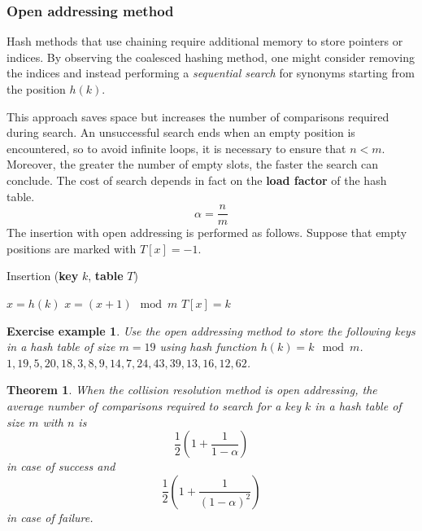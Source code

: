 \documentclass{report}
\newtheorem{teo}{Theorem}[chapter]
\newtheorem{es}{Exercise example}[chapter]
\begin{document}
\subsubsection{Open addressing method}
Hash methods that use chaining require additional memory to store pointers or indices. By observing the coalesced hashing method, one might consider removing the indices and instead performing a \textit{sequential search} for synonyms starting from the position $h(k)$.

This approach saves space but increases the number of comparisons required during search. An unsuccessful search ends when an empty position is encountered, so to avoid infinite loops, it is necessary to ensure that $n < m$. Moreover, the greater the number of empty slots, the faster the search can conclude. The cost of search depends in fact on the \textbf{load factor} of the hash table.
\begin{equation}
    \alpha = \frac{n}{m}
\end{equation}
\noindent The insertion with open addressing is performed as follows. Suppose that empty positions are marked with \(T[x] = -1\).
\begin{algorithm}[H]
    \caption{Insertion (\textbf{key} \(k\), \textbf{table} \(T\))}
    \begin{algorithmic}[1]
    \State \( x = h(k) \)
        \State \( x = (x+1) \mod m \)
    \EndWhile
    \State{} \(T[x] = k\)
    \end{algorithmic}
\end{algorithm}
\begin{es}
    Use the open addressing method to store the following keys in a hash table of size \(m=19\) using hash function \(h(k) = k \mod m\). \( 1, 19, 5, 20, 18, 3, 8, 9, 14, 7, 24, 43, 39, 13, 16, 12, 62\).
\end{es}
\begin{teo}
    When the collision resolution method is open addressing, the average number of comparisons required to search for a key \(k\) in a hash table of size \(m\) with \(n\) is
    \begin{equation}
        \frac{1}{2} \left( 1 + \frac{1}{1-\alpha}\right)
    \end{equation}
    in case of success and
    \begin{equation}
        \frac{1}{2} \left( 1 + \frac{1}{(1-\alpha)^2}\right)
    \end{equation}
    in case of failure.
\end{teo}
\end{document}
